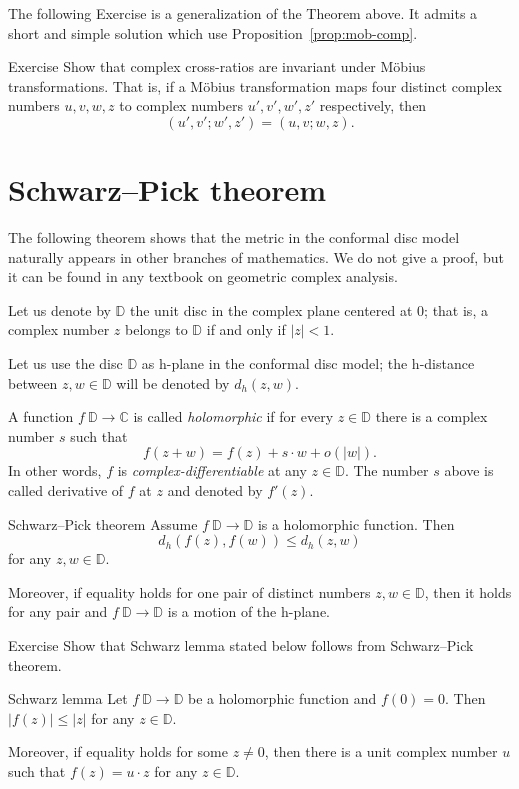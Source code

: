 The following Exercise is a generalization of the Theorem above.
It admits a short and simple solution which use Proposition~\ref{prop:mob-comp}.

\begin{thm}{Exercise}\label{ex:C-cross-ratio}
Show that 
complex cross-ratios are invariant under M\"obius transformations. 
That is, if a M\"obius transformation maps four distinct complex numbers $u, v, w, z$ to complex numbers $u', v', w', z'$ respectively, then
$$
(u',v';w',z')
=
(u,v;w,z).
$$

\end{thm}

\section*{Schwarz--Pick theorem}
The following theorem shows 
that the metric in the conformal disc model naturally appears in other branches of mathematics.
We do not give a proof, but it can be found in any textbook on geometric complex analysis.

Let us denote by $\mathbb{D}$
the unit disc in the complex plane centered at $0$;
that is, a complex number $z$
belongs to $\mathbb{D}$ if and only if $|z|<1$.

Let us use the disc $\mathbb{D}$ as h-plane in the conformal disc model;
the h-distance between $z, w\in\mathbb{D}$ will be denoted by $d_h(z,w)$.

A function $f\:\mathbb{D}\to \mathbb{C}$ is called \emph{holomorphic} if for every $z\in \mathbb{D}$
there is a complex number $s$ such that
\[f(z+w)=f(z)+s\cdot w+o(|w|).\]
In other words, $f$ is {}\emph{complex-differentiable}
at any $z\in\mathbb{D}$.
The number $s$ above is called derivative of $f$ at $z$ and denoted by $f'(z)$.

\begin{thm}{Schwarz--Pick theorem}
Assume $f\: \mathbb{D}\to \mathbb{D}$ is a holomorphic function.
Then 
\[d_h(f(z),f(w))\le d_h(z,w)\]
for any $z,w\in \mathbb{D}$.

Moreover, if equality holds for one pair of distinct numbers $z,w\in \mathbb{D}$, then it holds for any pair and  $f\: \mathbb{D}\to \mathbb{D}$ is a motion of the h-plane.
\end{thm}

\begin{thm}{Exercise}\label{ex:schwarz}
Show that Schwarz lemma stated below 
follows from Schwarz--Pick theorem.
\end{thm}

\begin{thm}{Schwarz lemma}
Let $f\: \mathbb{D}\to \mathbb{D}$ be a holomorphic function
and $f(0)=0$.
Then 
$|f(z)|\le |z|$
for any $z\in \mathbb{D}$.

Moreover, if equality holds for some $z\ne 0$, then there is a unit complex number $u$ 
such that 
$f(z)=u\cdot z$
for any $z\in\mathbb{D}$.
\end{thm}






